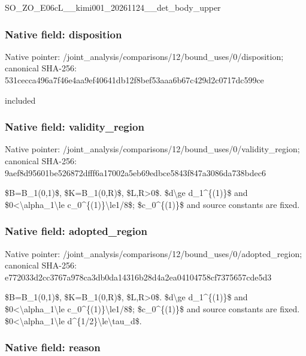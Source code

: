 \documentclass[10pt,a4paper]{article}
\begin{document}
SO\_ZO\_E06cL\_\_kimi001\_202\allowbreak{}61124\_\_det\_body\_upper


\subsubsection{Native field: disposition}


Native pointer: /joint\_analysis/comparis\allowbreak{}ons/12/bound\_uses/0/disp\allowbreak{}osition; canonical SHA-256: 531cecca496a7f46e4aa9ef4\allowbreak{}0641db12f8bef53aaa6b67c4\allowbreak{}29d2c0717dc599ce


included


\subsubsection{Native field: validity\_region}


Native pointer: /joint\_analysis/comparis\allowbreak{}ons/12/bound\_uses/0/vali\allowbreak{}dity\_region; canonical SHA-256: 9aef8d95601be526872dfff6\allowbreak{}a17002a5eb69edbce5843f84\allowbreak{}7a3086da738bdec6


\$B=B\_1(0,1)\$, \$K=B\_1(0,R)\$, \$L,R>0\$. \$d\textbackslash{}ge d\_1\textasciicircum{}\{(1)\}\$ and \$0<\textbackslash{}alpha\_1\textbackslash{}le c\_0\textasciicircum{}\{(1)\}\textbackslash{}le1/8\$; \$c\_0\textasciicircum{}\{(1)\}\$ and source constants are fixed.


\subsubsection{Native field: adopted\_region}


Native pointer: /joint\_analysis/comparis\allowbreak{}ons/12/bound\_uses/0/adop\allowbreak{}ted\_region; canonical SHA-256: e772033d2cc3767a978ca3db\allowbreak{}0da14316b28d4a2ea0410475\allowbreak{}8cf7375657cde5d3


\$B=B\_1(0,1)\$, \$K=B\_1(0,R)\$, \$L,R>0\$. \$d\textbackslash{}ge d\_1\textasciicircum{}\{(1)\}\$ and \$0<\textbackslash{}alpha\_1\textbackslash{}le c\_0\textasciicircum{}\{(1)\}\textbackslash{}le1/8\$; \$c\_0\textasciicircum{}\{(1)\}\$ and source constants are fixed. \$0<\textbackslash{}alpha\_1\textbackslash{}le d\textasciicircum{}\{1/2\}\textbackslash{}le\textbackslash{}tau\_d\$.


\subsubsection{Native field: reason}
\end{document}
